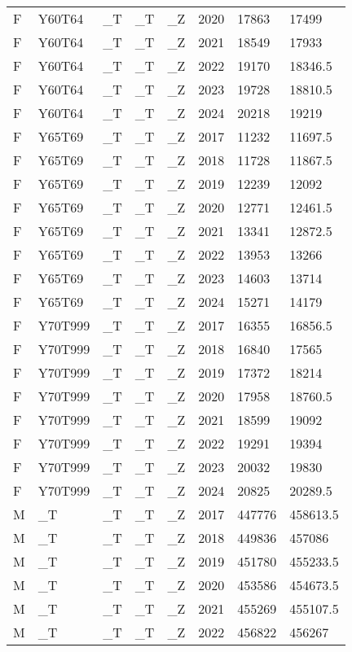 \begin{longtable}[t]{llllllll}
F & Y60T64 & \_T & \_T & \_Z & 2020 & 17863 & 17499\\
F & Y60T64 & \_T & \_T & \_Z & 2021 & 18549 & 17933\\
F & Y60T64 & \_T & \_T & \_Z & 2022 & 19170 & 18346.5\\
\addlinespace
F & Y60T64 & \_T & \_T & \_Z & 2023 & 19728 & 18810.5\\
F & Y60T64 & \_T & \_T & \_Z & 2024 & 20218 & 19219\\
F & Y65T69 & \_T & \_T & \_Z & 2017 & 11232 & 11697.5\\
F & Y65T69 & \_T & \_T & \_Z & 2018 & 11728 & 11867.5\\
F & Y65T69 & \_T & \_T & \_Z & 2019 & 12239 & 12092\\
\addlinespace
F & Y65T69 & \_T & \_T & \_Z & 2020 & 12771 & 12461.5\\
F & Y65T69 & \_T & \_T & \_Z & 2021 & 13341 & 12872.5\\
F & Y65T69 & \_T & \_T & \_Z & 2022 & 13953 & 13266\\
F & Y65T69 & \_T & \_T & \_Z & 2023 & 14603 & 13714\\
F & Y65T69 & \_T & \_T & \_Z & 2024 & 15271 & 14179\\
\addlinespace
F & Y70T999 & \_T & \_T & \_Z & 2017 & 16355 & 16856.5\\
F & Y70T999 & \_T & \_T & \_Z & 2018 & 16840 & 17565\\
F & Y70T999 & \_T & \_T & \_Z & 2019 & 17372 & 18214\\
F & Y70T999 & \_T & \_T & \_Z & 2020 & 17958 & 18760.5\\
F & Y70T999 & \_T & \_T & \_Z & 2021 & 18599 & 19092\\
\addlinespace
F & Y70T999 & \_T & \_T & \_Z & 2022 & 19291 & 19394\\
F & Y70T999 & \_T & \_T & \_Z & 2023 & 20032 & 19830\\
F & Y70T999 & \_T & \_T & \_Z & 2024 & 20825 & 20289.5\\
M & \_T & \_T & \_T & \_Z & 2017 & 447776 & 458613.5\\
M & \_T & \_T & \_T & \_Z & 2018 & 449836 & 457086\\
\addlinespace
M & \_T & \_T & \_T & \_Z & 2019 & 451780 & 455233.5\\
M & \_T & \_T & \_T & \_Z & 2020 & 453586 & 454673.5\\
M & \_T & \_T & \_T & \_Z & 2021 & 455269 & 455107.5\\
M & \_T & \_T & \_T & \_Z & 2022 & 456822 & 456267\\

\end{longtable}
